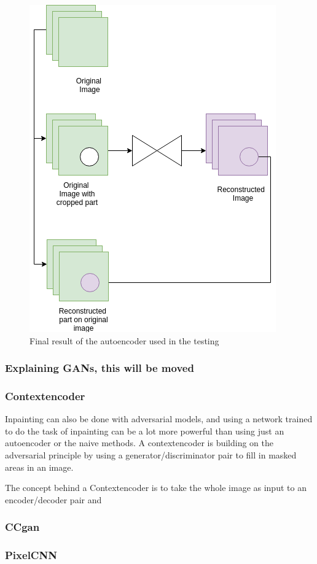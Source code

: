     
    \begin{figure}[ht!]
        \centering
        \includegraphics[scale=0.5]{background/figures/AE_for_inpainting.png}
        \caption{Final result of the autoencoder used in the testing}
    \end{figure}
    
    
    
    
    
      \subsubsection{Explaining GANs, this will be moved}
      
    
      \subsubsection{Contextencoder}
    Inpainting can also be done with adversarial models, and using a network trained to do the task of inpainting can be a lot more powerful than using just an autoencoder or the naive methods.
    A contextencoder is building on the adversarial principle by using a generator/discriminator pair to fill in masked areas in an image. 
    
    The concept behind a Contextencoder is to take the whole image as input to an encoder/decoder pair and 
    
    
    
      \subsubsection{CCgan}
      \subsubsection{PixelCNN}
      
\fi

  
 
